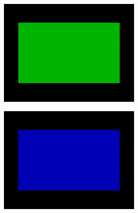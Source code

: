 \begin{figure}[ht]
\begin{subfigure}{\textwidth}
\begin{subfigure}{0.24\textwidth}
            \caption*{}
            \label{fig:background_spd_intuition-white_red}
        \end{subfigure}
        \hfill
        \begin{subfigure}{0.24\textwidth}
            \centering
            \includegraphics[width=\textwidth]{images/02-spd_intuition-white_green.png}
            \caption*{}
            \label{fig:background_spd_intuition-white_green}
        \end{subfigure}
        \hfill
        \begin{subfigure}{0.24\textwidth}
            \centering
            \includegraphics[width=\textwidth]{images/02-spd_intuition-white_blue.png}
            \caption*{}
            \label{fig:background_spd_intuition-white_blue}
        \end{subfigure}
        

\end{subfigure}
\end{figure}
